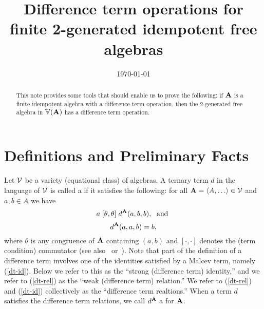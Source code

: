 



\usepackage{inputs/macros}



\title[Difference Term Operation for $\bF_{\sV}(2)$]
{Difference term operations for finite 2-generated idempotent free algebras}
\date{\today}
\address{University of Hawaii}


\maketitle

\renewcommand{\etaR}{\ensuremath{\eta}}

\begin{abstract}
This note provides some tools that should enable us to prove
the following: if $\mathbf{A}$ is a finite idempotent algebra with a
difference term operation, then the 2-generated free algebra in $\operatorname{\mathbb{V}}(\mathbf{A})$ has
a difference term operation.  
\end{abstract}

\section{Definitions and Preliminary Facts}
\label{sec:facts}

Let $\mathcal{V}$ be a variety (equational class) of algebras.
A ternary term $d$ in the language of $\mathcal{V}$ is called 
a  if it satisfies the following:
for all $\bA = \<A, \dots \> \in \sV$ and $a, b \in A$ we have
\begin{equation}
  \label{dt-rel}
  a \mathrel{[\theta, \theta]} d^{\mathbf{A}}(a,b,b), \; \text{ and }
\end{equation}
\begin{equation}
  \label{dt-id}
d^{\mathbf{A}}(a,a,b) = b, 
\end{equation}
where $\theta$ is any congruence of $\mathbf{A}$
containing $(a,b)$
and $[\cdot, \cdot]$ denotes the (term condition) commutator
(see also~\cite{HM:1988} or~\cite{MR3076179}).
Note that part of
the definition of a difference term involves one of
the identities satisfied by a Malcev term, namely
(\ref{dt-id}). Below we refer to this as the ``strong (difference term) identity,''
and we refer to (\ref{dt-rel}) as the ``weak (difference term) relation.''
We refer to (\ref{dt-rel}) and (\ref{dt-id}) collectively as the ``difference term
realtions.''
When a term $d$ satisfies the difference term relations, we call $d^{\mathbf{A}}$
a  for $\mathbf{A}$.

